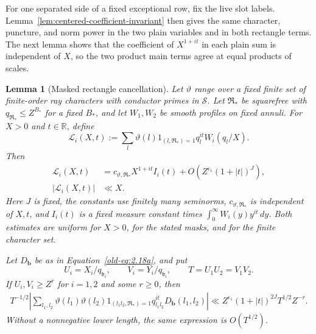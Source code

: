 \documentclass[12pt]{article}
\newtheorem{lemma}[theorem]{Lemma}
\begin{document}
For one separated side of a fixed exceptional row, fix the live slot
labels.  Lemma~\ref{lem:centered-coefficient-invariant} then gives the same
character, puncture, and norm power in the two plain variables and in both
rectangle terms.  The next lemma shows that the coefficient of \(X^{1+it}\)
in each plain sum is independent of \(X\), so the two product main terms
agree at equal products of scales.

\begin{lemma}[Masked rectangle cancellation]
\label{lem:centered-lattice-cancellation}
Let \(\vartheta\) range over a fixed finite set of finite-order
ray characters with conductor primes in \(\mathcal S\).  Let
\(\mathfrak R_*\) be squarefree with \(q_{\mathfrak R_*}\le Z^{B_*}\)
for a fixed \(B_*\), and let \(W_1,W_2\) be smooth profiles on
fixed annuli.  For \(X>0\) and \(t\in\mathbb R\), define
\[
 \mathcal L_i(X,t):=
 \sum_l\vartheta(l)1_{(l,\mathfrak R_*)=1}
           q_l^{it}W_i(q_l/X).
\]
Then
\begin{align}
 \mathcal L_i(X,t)
 &=c_{\vartheta,\mathfrak R_*}X^{1+it}I_i(t)
   +O\left(Z^{\epsilon_1}(1+|t|)^J\right),
 \label{old-eq:2.18d}\\
 |\mathcal L_i(X,t)|&\ll X.
 \label{old-eq:2.18e}
\end{align}
Here \(J\) is fixed, the constants use finitely many seminorms,
\(c_{\vartheta,\mathfrak R_*}\) is independent of \(X,t\), and
\(I_i(t)\) is a fixed measure constant times
\(\int_0^\infty W_i(y)y^{it}\,dy\).
Both estimates are uniform for \(X>0\), for the stated masks, and
for the finite character set.

Let \(D_{\mathbf b}\) be as in
Equation~\eqref{old-eq:2.18a}, and put
\[
 U_i=X_i/q_{\mathfrak b_i},\qquad
 V_i=Y_i/q_{\mathfrak b_i},\qquad
 T=U_1U_2=V_1V_2.
\]
If \(U_i,V_i\ge Z^r\) for \(i=1,2\) and some \(r\ge0\),
then
\begin{equation}
 \begin{split}
 T^{-1/2}\left|
 \sum_{l_1,l_2}
 \vartheta(l_1)\vartheta(l_2)
 1_{(l_1l_2,\mathfrak R_*)=1}
 q_{l_1l_2}^{it}D_{\mathbf b}(l_1,l_2)
 \right|
 \ll Z^{\epsilon_1}(1+|t|)^{2J}T^{1/2}Z^{-r}.
 \end{split}
 \label{old-eq:2.18f}
\end{equation}
Without a nonnegative lower length, the same expression is
\(O(T^{1/2})\).
\end{lemma}
\end{document}
